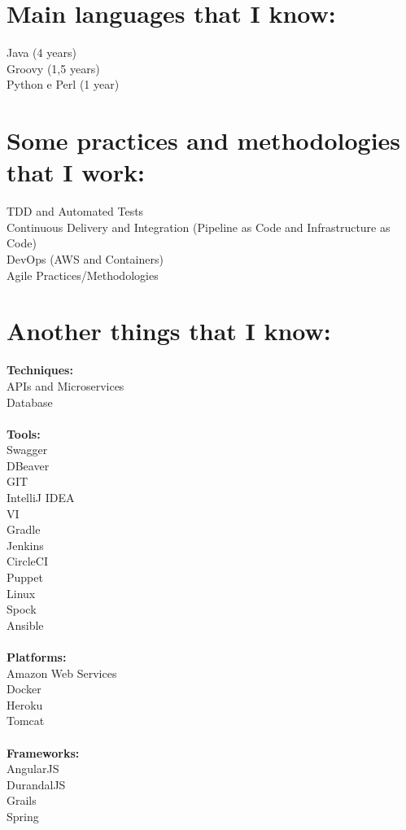 \documentclass[]{friggeri-cv}
\begin{document}
\section{Main languages that I know:}
Java (4 years)\\
Groovy (1,5 years)\\
Python e Perl (1 year)\\

\section{Some practices and methodologies that I work:}
TDD and Automated Tests\\
Continuous Delivery and Integration (Pipeline as Code and Infrastructure as Code)\\
DevOps (AWS and Containers)\\
Agile Practices/Methodologies\\

\section{Another things that I know:}
\begin{multicols}{3}
    \textbf{Techniques:}\\
    APIs and Microservices\\
    Database\\\\
    \textbf{Tools:}\\
    Swagger\\
    DBeaver\\
    GIT\\
    IntelliJ IDEA\\
    VI\\
    Gradle\\
    Jenkins\\
    CircleCI\\
    Puppet\\
    Linux\\
    Spock\\
    Ansible\\\\
    \textbf{Platforms:}\\
    Amazon Web Services\\
    Docker\\
    Heroku\\
    Tomcat\\\\
    \textbf{Frameworks:}\\
    AngularJS\\
    DurandalJS\\
    Grails\\
    Spring
\end{multicols}
\end{document}
